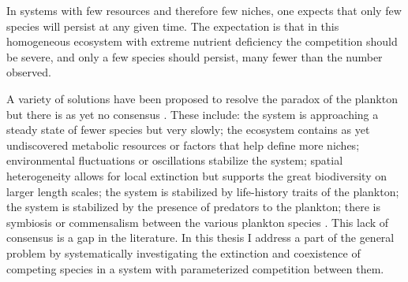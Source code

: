 In systems with few resources and therefore few niches, one expects that only few species will persist at any given time.
The expectation is that in this homogeneous ecosystem with extreme nutrient deficiency the competition should be severe, and only a few species should persist, many fewer than the number observed. 

A variety of solutions have been proposed to resolve the paradox of the plankton but there is as yet no consensus \cite{Roy2007}.
These include: the system is approaching a steady state of fewer species but very slowly; the ecosystem contains as yet undiscovered metabolic resources or factors that help define more niches; environmental fluctuations or oscillations stabilize the system; spatial heterogeneity allows for local extinction but supports the great biodiversity on larger length scales; the system is stabilized by life-history traits of the plankton; the system is stabilized by the presence of predators to the plankton; there is symbiosis or commensalism between the various plankton species \cite{Hutchinson1961,May1999,Chesson2000,Roy2007}. 
This lack of consensus is a gap in the literature. 
In this thesis I address a part of the general problem by systematically investigating the extinction and coexistence of competing species in a system with parameterized competition between them. 

